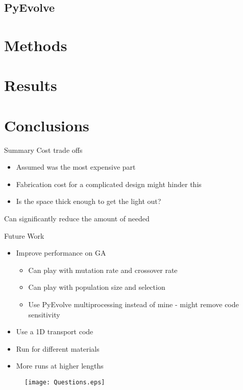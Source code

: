 \documentclass[compress]{beamer}
\begin{document}
\subsection{PyEvolve}

\section{Methods}

\section{Results}

\section{Conclusions}
\begin{frame}{Summary}
Cost trade offs
\begin{itemize}
	\item Assumed  was the most expensive part
	\item Fabrication cost for a complicated design might hinder this
	\item Is the space thick enough to get the light out?
\end{itemize}
Can significantly reduce the amount of  needed
\end{frame}
\begin{frame}{Future Work}
\begin{itemize}
	\item Improve performance on GA
	\small
	\begin{itemize}
		\item Can play with mutation rate and crossover rate
		\item Can play with population size and selection
		\item Use PyEvolve multiprocessing instead of mine - might remove code sensitivity
	\end{itemize}
	\normalsize
	\item Use a 1D transport code
	\item Run for different materials
	\item More runs at higher lengths
\end{itemize}
\end{frame}
\begin{frame}
	\centering
\begin{figure}
  \texttt{[image: Questions.eps]}
\end{figure}
\end{frame}
%  
\end{document}
